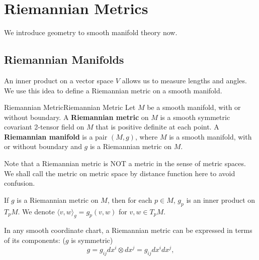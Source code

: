 \documentclass[../main.tex]{subfiles}
\begin{document}
\chapter{Riemannian Metrics}

We introduce geometry to smooth manifold theory now.
\section{Riemannian Manifolds}
An inner product on a vector space $V$ allows us to measure lengths and angles. We use this idea to define a Riemannian metric on a smooth manifold.
\begin{definition}{Riemannian Metric}{Riemannian Metric}
  Let $M$ be a smooth manifold, with or without boundary. A \textbf{Riemannian metric} on $M$ is a smooth symmetric covariant 2-tensor field on $M$ that is positive definite at each point. A \textbf{Riemannian manifold} is a pair $(M,g)$, where $M$ is a smooth manifold, with or without boundary and $g$ is a Riemannian metric on $M$.
\end{definition}
Note that a Riemannian metric is NOT a metric in the sense of metric spaces. We shall call the metric on metric space by distance function here to avoid confusion.

If $g$ is a Riemannian metric on $M$, then for each $p\in M$, $g_p$ is an inner product on $T_pM$. We denote $\langle v,w\rangle_g=g_p(v,w)$ for $v,w\in T_pM$.

In any smooth coordinate chart, a Riemannian metric can be expressed in terms of its components: ($g$ is symmetric)
\begin{equation*}
  g = g_{ij}dx^i\otimes dx^j = g_{ij}dx^i dx^j,
\end{equation*}
\end{document}
